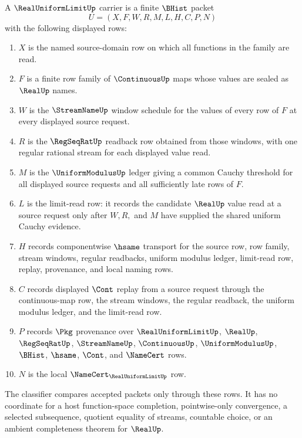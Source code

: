 \begin{definition}
\label{def:real-uniform-limit-carrier}
A $\RealUniformLimitUp$ carrier is a finite $\BHist$ packet
$$
U=(X,F,W,R,M,L,H,C,P,N)
$$
with the following displayed rows:
\begin{enumerate}
\item $X$ is the named source-domain row on which all functions in the family are read.
\item $F$ is a finite row family of $\ContinuousUp$ maps whose values are sealed as $\RealUp$ names.
\item $W$ is the $\StreamNameUp$ window schedule for the values of every row of $F$ at every displayed source request.
\item $R$ is the $\RegSeqRatUp$ readback row obtained from those windows, with one regular rational stream for each displayed value read.
\item $M$ is the $\UniformModulusUp$ ledger giving a common Cauchy threshold for all displayed source requests and all sufficiently late rows of $F$.
\item $L$ is the limit-read row: it records the candidate $\RealUp$ value read at a source request only after $W,R,$ and $M$ have supplied the shared uniform Cauchy evidence.
\item $H$ records componentwise $\hsame$ transport for the source row, row family, stream windows, regular readbacks, uniform modulus ledger, limit-read row, replay, provenance, and local naming rows.
\item $C$ records displayed $\Cont$ replay from a source request through the continuous-map row, the stream windows, the regular readback, the uniform modulus ledger, and the limit-read row.
\item $P$ records $\Pkg$ provenance over $\RealUniformLimitUp$, $\RealUp$, $\RegSeqRatUp$, $\StreamNameUp$, $\ContinuousUp$, $\UniformModulusUp$, $\BHist$, $\hsame$, $\Cont$, and $\NameCert$ rows.
\item $N$ is the local $\NameCert_{\RealUniformLimitUp}$ row.
\end{enumerate}
The classifier compares accepted packets only through these rows. It has no coordinate for a host function-space completion, pointwise-only convergence, a selected subsequence, quotient equality of streams, countable choice, or an ambient completeness theorem for $\RealUp$.
\end{definition}

